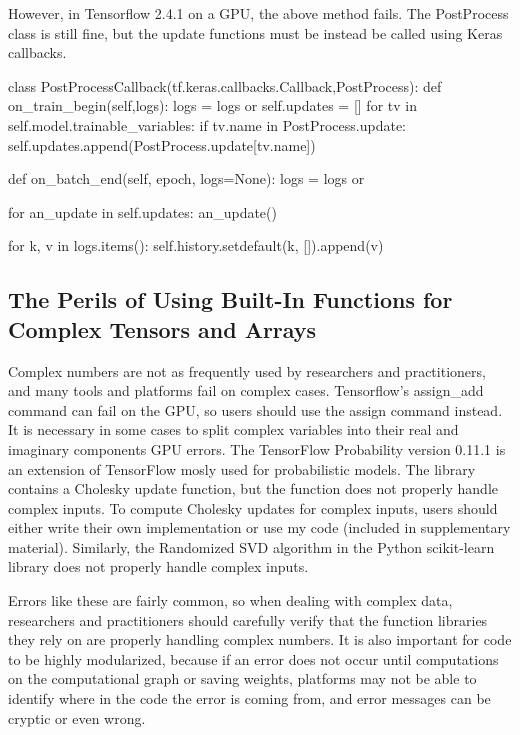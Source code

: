 However, in Tensorflow 2.4.1 on a GPU, the above method fails. The PostProcess class is still fine, but the update functions must be instead be called using Keras callbacks.
\begin{code}
class PostProcessCallback(tf.keras.callbacks.Callback,PostProcess):
    def on_train_begin(self,logs):
        logs = logs or {}
        self.updates = []
        for tv in self.model.trainable_variables:
            if tv.name in PostProcess.update:
                self.updates.append(PostProcess.update[tv.name])

    def on_batch_end(self, epoch, logs=None):
        logs = logs or {}

        for an_update in self.updates:
            an_update()

        for k, v in logs.items():
            self.history.setdefault(k, []).append(v)
\end{code}

\subsection{The Perils of Using Built-In Functions for Complex Tensors and Arrays}
Complex numbers are not as frequently used by researchers and practitioners, and many tools and platforms fail on complex cases.  Tensorflow's assign\_add command can fail on the GPU, so users should use the assign command instead. It is necessary in some cases to split complex variables into their real and imaginary components GPU errors. 
The TensorFlow Probability version 0.11.1 \cite{tensorflowprobability} is an extension of TensorFlow mosly used for probabilistic models. The library contains a Cholesky update function, but the function does not properly handle complex inputs. To compute Cholesky updates for complex inputs, users should either write their own implementation or use my code (included in supplementary material). Similarly, the Randomized SVD algorithm in the Python scikit-learn library does not properly handle complex inputs.

Errors like these are fairly common, so when dealing with complex data, researchers and practitioners should carefully verify that the function libraries they rely on are properly handling complex numbers. It is also important for code to be highly modularized, because if an error does not occur until computations on the computational graph or saving weights, platforms may not be able to identify where in the code the error is coming from, and error messages can be cryptic or even wrong.
